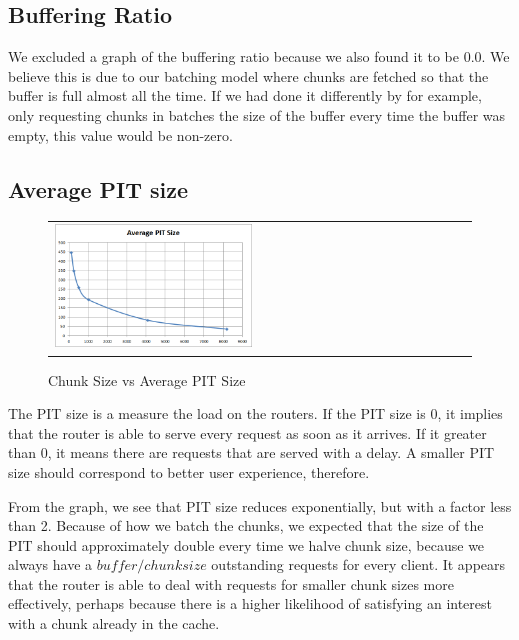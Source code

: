 \subsection{Buffering Ratio} \label{sec:bufferingratio}

We excluded a graph of the buffering ratio because we also found it to be 0.0.
We believe this is due to our batching model where chunks are fetched so that
the buffer is full almost all the time. If we had done it differently by for
example, only requesting chunks in batches the size of the buffer every time the
buffer was empty, this value would be non-zero.

\subsection{Average PIT size} \label{sec:pit}

\begin{figure}[!htbp]
    \begin{center}
        \begin{tabular}{l}
            \includegraphics[width=0.48\textwidth]{fig/pit.png}
            \\
        \end{tabular}
        \caption{Chunk Size vs Average PIT Size}
        \label{fig:pit}
    \end{center}
\end{figure}

The PIT size is a measure the load on the routers. If the PIT size is 0, it
implies that the router is able to serve every request as soon as it arrives. If
it greater than 0, it means there are requests that are served with a delay. A
smaller PIT size should correspond to better user experience, therefore.

From the graph, we see that PIT size reduces exponentially, but with a factor
less than 2. Because of how we batch the chunks, we expected that the size of
the PIT should approximately double every time we halve chunk size, because
we always have a $buffer / chunk size$ outstanding requests for every client. It
appears that the router is able to deal with requests for smaller chunk sizes
more effectively, perhaps because there is a higher likelihood of satisfying an
interest with a chunk already in the cache.

